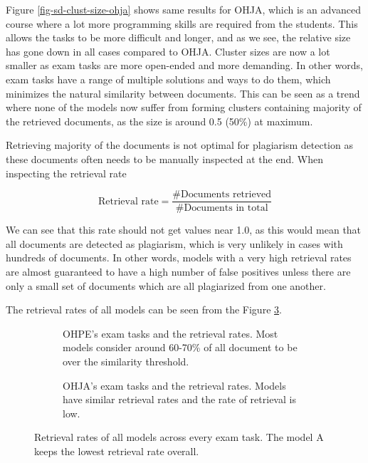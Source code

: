 Figure \ref{fig-sd-clust-size-ohja} shows same results for OHJA, which is an advanced course where a lot more programming skills are required from the students. This allows the tasks to be more difficult and longer, and as we see, the relative size has gone down in all cases compared to OHJA. Cluster sizes are now a lot smaller as exam tasks are more open-ended and more demanding. In other words, exam tasks have a range of multiple solutions and ways to do them, which minimizes the natural similarity between documents. This can be seen as a trend where none of the models now suffer from forming clusters containing majority of the retrieved documents, as the size is around 0.5 (50\%) at maximum. 


Retrieving majority of the documents is not optimal for plagiarism detection as these documents often needs to be manually inspected at the end. When inspecting the retrieval rate \ie 

\begin{equation}
    \text{Retrieval rate} = \dfrac{\#\text{Documents retrieved}}{\#\text{Documents in total}}
\end{equation}

\noindent
We can see that this rate should not get values near 1.0, as this would mean that all documents are detected as plagiarism, which is very unlikely in cases with hundreds of documents. In other words, models with a very high retrieval rates are almost guaranteed to have a high number of false positives unless there are only a small set of documents which are all plagiarized from one another. 

The retrieval rates of all models can be seen from the Figure \ref{fig-sd-retrieval-rate}.

\begin{figure}[ht] 
  \centering
  \begin{subfigure}[b]{0.8\linewidth}
    \centering
    \setlength\figureheight{5cm}
    \setlength\figurewidth{\textwidth}
    
    \caption{OHPE's exam tasks and the retrieval rates. Most models consider around 60-70\% of all document to be over the similarity threshold.} 
    \label{fig-sd-retrieval-rate:a} 
    \vspace{1ex}
  \end{subfigure}
  
  \begin{subfigure}[b]{0.8\linewidth}
    \centering
    \setlength\figureheight{5cm}
    \setlength\figurewidth{\textwidth}
    
    \caption{OHJA's exam tasks and the retrieval rates. Models have similar retrieval rates and the rate of retrieval is low.} 
    \label{fig-sd-retrieval-rate:b} 
  \end{subfigure}
\caption{Retrieval rates of all models across every exam task. The model A keeps the lowest retrieval rate overall.}
\label{fig-sd-retrieval-rate}
\end{figure}

